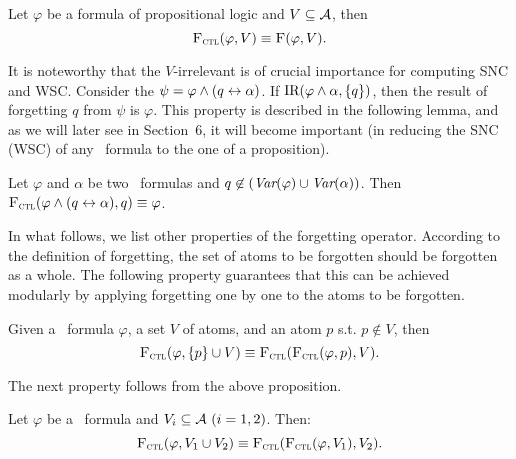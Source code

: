 \documentclass[twoside,11pt]{article}
\begin{document}
\begin{theorem}\label{thm:PL:CTL}
	Let $\varphi$ be a formula of propositional logic and $V\subseteq {\cal A}$, then
	\[
	{\textsc{F}_{\textsc{ctl}}}(\varphi, V) \equiv \textsc{F}(\varphi, V).
	\]
\end{theorem}


It is noteworthy  that the $V$-irrelevant is of crucial importance for computing SNC and WSC. Consider the $\psi=\varphi\wedge (q\leftrightarrow \alpha)$. If $\textrm{IR}(\varphi \wedge \alpha, \{q\})$, then the result of forgetting $q$ from $\psi$ is $\varphi$. This property is described in the following lemma, and as we will later see in Section~6, it will become important (in reducing the SNC (WSC) of any \CTL\ formula to the one of a proposition).

\begin{lemma}\label{lem:KF:eq}
	Let $\varphi$ and $\alpha$ be two \CTL\ formulas and $q\not \in
	(\textit{Var}(\varphi) \cup \textit{Var}(\alpha))$. Then
	${\textsc{F}_{\textsc{ctl}}}(\varphi \wedge (q\leftrightarrow\alpha), q)\equiv \varphi$.
\end{lemma}


In what follows, we list other properties of the forgetting operator. According to the definition of forgetting, the set of atoms to be forgotten should be forgotten as a whole.
The following property guarantees that this can be achieved modularly by applying forgetting one by one to the atoms to be forgotten.
\begin{proposition}[Modularity]\label{disTF}
	Given a \CTL\ formula $\varphi$, a set $V$ of atoms, and an atom $p$ s.t.  $p \notin V$, then
	\[
	{\textsc{F}_{\textsc{ctl}}}(\varphi, \{p\} \cup V) \equiv {\textsc{F}_{\textsc{ctl}}}({\textsc{F}_{\textsc{ctl}}}(\varphi, p), V).
	\]
\end{proposition}

The next property follows from the above proposition.

\begin{corollary}[Commutativity]\label{disTFV}
	Let $\varphi$ be a \CTL\ formula and $V_i\subseteq{\cal A}~(i=1,2)$. Then:
	\[
	{\textsc{F}_{\textsc{ctl}}}(\varphi, V_1 \cup V_2) \equiv {\textsc{F}_{\textsc{ctl}}}({\textsc{F}_{\textsc{ctl}}}(\varphi, V_1), V_2).
	\]
\end{corollary}
\end{document}
